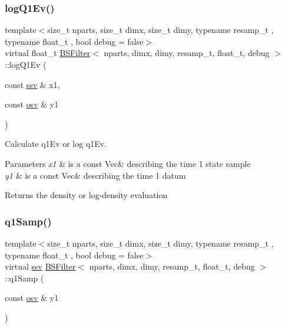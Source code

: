 \subsubsection{\texorpdfstring{log\+Q1\+Ev()}{logQ1Ev()}}
{\footnotesize\ttfamily template$<$size\+\_\+t nparts, size\+\_\+t dimx, size\+\_\+t dimy, typename resamp\+\_\+t , typename float\+\_\+t , bool debug = false$>$ \\
virtual float\+\_\+t \hyperlink{classBSFilter}{B\+S\+Filter}$<$ nparts, dimx, dimy, resamp\+\_\+t, float\+\_\+t, debug $>$\+::log\+Q1\+Ev (\begin{DoxyParamCaption}\item[{const \hyperlink{classBSFilter_ad2341b982bcdabc798d7ed0f327d28f7}{ssv} \&}]{x1,  }\item[{const \hyperlink{classBSFilter_a9a4da560f11a6e2d35ffe693de54826b}{osv} \&}]{y1 }\end{DoxyParamCaption})\hspace{0.3cm}{\ttfamily [pure virtual]}}



Calculate q1\+Ev or log q1\+Ev. 


\begin{DoxyParams}{Parameters}
{\em x1} & is a const Vec\& describing the time 1 state sample \\
\hline
{\em y1} & is a const Vec\& describing the time 1 datum \\
\hline
\end{DoxyParams}
\begin{DoxyReturn}{Returns}
the density or log-\/density evaluation 
\end{DoxyReturn}
\mbox{\label{classBSFilter_a82185282cbc7ddf5983933ccd7705577}} 
\subsubsection{\texorpdfstring{q1\+Samp()}{q1Samp()}}
{\footnotesize\ttfamily template$<$size\+\_\+t nparts, size\+\_\+t dimx, size\+\_\+t dimy, typename resamp\+\_\+t , typename float\+\_\+t , bool debug = false$>$ \\
virtual \hyperlink{classBSFilter_ad2341b982bcdabc798d7ed0f327d28f7}{ssv} \hyperlink{classBSFilter}{B\+S\+Filter}$<$ nparts, dimx, dimy, resamp\+\_\+t, float\+\_\+t, debug $>$\+::q1\+Samp (\begin{DoxyParamCaption}\item[{const \hyperlink{classBSFilter_a9a4da560f11a6e2d35ffe693de54826b}{osv} \&}]{y1 }\end{DoxyParamCaption})\hspace{0.3cm}{\ttfamily [pure virtual]}}



